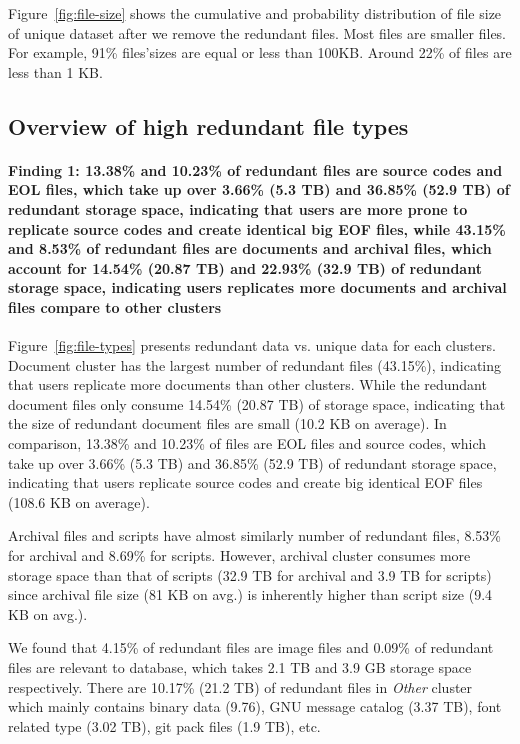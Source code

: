 Figure~\ref{fig:file-size} shows the cumulative and probability distribution of file size of unique dataset after we remove the redundant files.
Most files are smaller files. For example, 91\% files'sizes are equal or less than 100KB. 
Around 22\% of files are less than 1 KB.
 

\subsection{Overview of high redundant file types}

\paragraph{Finding 1: 13.38\% and 10.23\% of redundant files are source codes and EOL files, which take up over 3.66\% (5.3 TB) and 36.85\% (52.9 TB) of redundant storage space, indicating that users are more prone to replicate source codes and create identical big EOF files, while 43.15\% and 8.53\% of redundant files are documents and archival files, which account for 14.54\% (20.87 TB) and 22.93\% (32.9 TB) of redundant storage space, indicating users replicates more documents and archival files compare to other clusters}

Figure~\ref{fig:file-types} presents redundant data vs. unique data for each clusters. 
Document cluster has the largest number of redundant files (43.15\%), indicating that users replicate more documents than other clusters. While the redundant document files only consume 14.54\% (20.87 TB) of storage space, indicating that the size of redundant document files are small (10.2 KB on average). In comparison, 13.38\% and 10.23\% of files are EOL files and source codes, which take up over 3.66\% (5.3 TB) and 36.85\% (52.9 TB) of redundant storage space, indicating that users replicate source codes and create big identical EOF files (108.6 KB on average).

Archival files and scripts have almost similarly number of redundant files, 8.53\% for archival and 8.69\% for scripts. However, archival cluster consumes more storage space than that of scripts (32.9 TB for archival and 3.9 TB for scripts) since archival file size (81 KB on avg.) is inherently higher than script size (9.4 KB on avg.).

We found that 4.15\% of redundant files are image files and 0.09\% of redundant files are relevant to database, which takes 2.1 TB and 3.9 GB storage space respectively. There are 10.17\% (21.2 TB) of redundant files in \textit{Other} cluster which mainly contains binary data (9.76), GNU message catalog (3.37 TB), font related type (3.02 TB), git pack files (1.9 TB), etc. 

